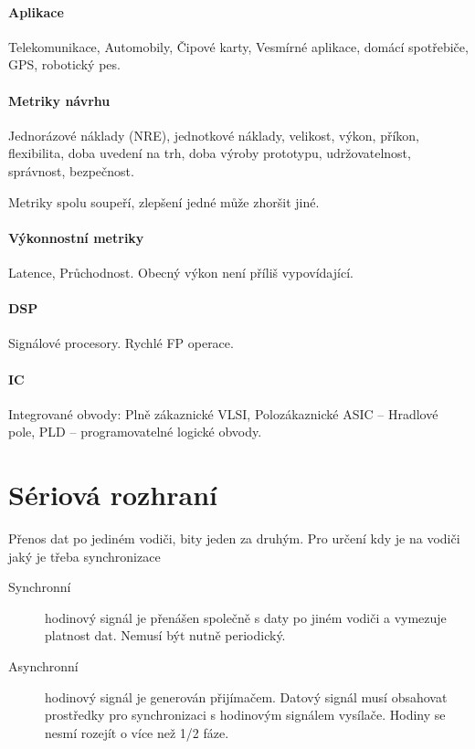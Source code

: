 \documentclass[a4paper, 11pt]{report}
\begin{document}
\paragraph{Aplikace}
Telekomunikace, Automobily, Čipové karty, Vesmírné aplikace, domácí spotřebiče, GPS, robotický pes.

\paragraph{Metriky návrhu}
Jednorázové náklady (NRE), jednotkové náklady, velikost, výkon, příkon, flexibilita, doba uvedení na trh, doba výroby prototypu, udržovatelnost, správnost, bezpečnost.

Metriky spolu soupeří, zlepšení jedné může zhoršit jiné.

\paragraph{Výkonnostní metriky}
Latence, Průchodnost. Obecný výkon není příliš vypovídající.

\paragraph{DSP} Signálové procesory. Rychlé FP operace.

\paragraph{IC} Integrované obvody: Plně zákaznické VLSI, Polozákaznické ASIC -- Hradlové pole, PLD -- programovatelné logické obvody.

\section{Sériová rozhraní}

Přenos dat po jediném vodiči, bity jeden za druhým. Pro určení kdy je na vodiči jaký je třeba synchronizace
\begin{description}
	\item[Synchronní] hodinový signál je přenášen společně s daty po jiném vodiči a vymezuje platnost dat. Nemusí být nutně periodický. 
	\item[Asynchronní] hodinový signál je generován přijímačem. Datový signál musí obsahovat prostředky pro synchronizaci s hodinovým signálem vysílače. Hodiny se nesmí rozejít o více než 1/2 fáze.
\end{description}
\end{document}
